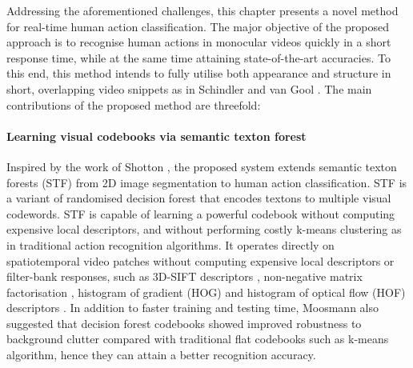 Addressing the aforementioned challenges, this chapter presents a novel method for real-time human action classification. The major objective of the proposed approach is to recognise human actions in monocular videos quickly in a short response time, while at the same time attaining state-of-the-art accuracies. To this end, this method intends to fully utilise both appearance and structure in short, overlapping video snippets as in Schindler and van Gool \cite{Schindler2008}. The main contributions of the proposed method are threefold:  

\paragraph{Learning visual codebooks via semantic texton forest} 
Inspired by the work of Shotton \etal \cite{Shotton2008}, the proposed system extends semantic texton forests (STF) from 2D image segmentation to human action classification. STF is a variant of randomised decision forest \cite{Ho1995, Amit1997, Breiman2001} that encodes textons to multiple visual codewords. STF is capable of learning a powerful codebook without computing expensive local descriptors, and without performing costly k-means clustering as in traditional action recognition algorithms. It operates directly on spatiotemporal video patches without computing expensive local descriptors or filter-bank responses, such as 3D-SIFT descriptors \cite{Scovanner2007}, non-negative matrix factorisation \cite{Wong2007}, histogram of gradient (HOG) \cite{Schuldt2004, Laptev2008} and histogram of optical flow (HOF) descriptors \cite{Riemenschneider2009}. 
In addition to faster training and testing time, Moosmann \etal \cite{Moosmann2007} also suggested that decision forest codebooks showed improved robustness to background clutter compared with traditional flat codebooks such as k-means algorithm, hence they can attain a better recognition accuracy.  


